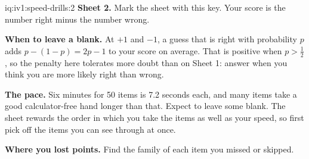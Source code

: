 \begin{solution}{iq:iv1:speed-drills:2}
\textbf{Sheet 2.} Mark the sheet with this key. Your score is the number right minus the number wrong.
\par\nopagebreak


\textbf{When to leave a blank.} At $+1$ and $-1$, a guess that is right with probability $p$ adds $p - (1 - p) = 2p - 1$ to your score on average. That is positive when $p > \tfrac12$, so the penalty here tolerates more doubt than on Sheet 1: answer when you think you are more likely right than wrong.

\textbf{The pace.} Six minutes for 50 items is 7.2 seconds each, and many items take a good calculator-free hand longer than that. Expect to leave some blank. The sheet rewards the order in which you take the items as well as your speed, so first pick off the items you can see through at once.

\textbf{Where you lost points.} Find the family of each item you missed or skipped.


\end{solution}

